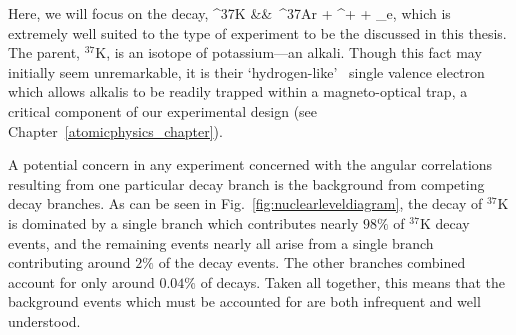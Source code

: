 Here, we will focus on the decay,
\bea
^{37}\textrm{K} &\rightarrow& \,^{37}\textrm{\!Ar} + \beta^{+} + \nu_e, 
\label{eq:ourdecay}
\eea
which is extremely well suited to the type of experiment to be the discussed in this thesis.  
The parent, $^{37}\textrm{K}$, is an isotope of potassium---an alkali.  Though this fact may initially seem unremarkable, it is their `hydrogen-like'~ single valence electron which allows alkalis to be readily trapped within a magneto-optical trap, a critical component of our experimental design (see Chapter~\ref{atomicphysics_chapter}).

A potential concern in any experiment concerned with the angular correlations resulting from one particular decay branch is the background from competing decay branches.  As can be seen in Fig.~\ref{fig:nuclearleveldiagram}, the decay of $^{37}\textrm{K}$ is dominated by a single branch which contributes nearly $98\%$ of $^{37}\textrm{K}$ decay events, and the remaining events nearly all arise from a single branch contributing around $2\%$ of the decay events.  The other branches combined account for only around $0.04\%$ of decays.  Taken all together, this means that the background events which must be accounted for are both infrequent and well understood.


